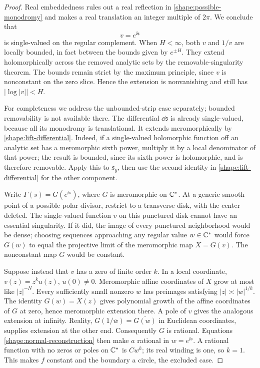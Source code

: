 \begin{proof}
Real embeddedness rules out a real reflection in
\eqref{shape:possible-monodromy} and makes a real translation an
integer multiple of \(2\pi\). We conclude that
\[
 v=e^{\ii\mathfrak s}
\]
is single-valued on the regular complement. When \(H<\infty\), both
\(v\) and \(1/v\) are locally bounded, in fact between the bounds
given by \(e^{\pm H}\). They extend holomorphically across the
removed analytic sets by the removable-singularity theorem. The
bounds remain strict by the maximum principle, since \(v\) is
nonconstant on the zero slice. Hence the extension is nonvanishing
and still has \(|\log|v||<H\).

For completeness we address the unbounded-strip case separately;
bounded removability is not available there. The differential
\(\dd\mathfrak s\) is already single-valued, because all its
monodromy is translational. It extends meromorphically by
\eqref{shape:lift-differential}. Indeed, if a single-valued
holomorphic function off an analytic set has a meromorphic sixth
power, multiply it by a local denominator of that power; the
result is bounded, since its sixth power is holomorphic, and is
therefore removable. Apply this to \(\mathfrak s_y\), then use the
second identity in \eqref{shape:lift-differential} for the other
component.

Write \(\Gamma(s)=G(e^{\ii s})\), where \(G\) is meromorphic on
\(\mathbb C^*\). At a generic smooth point of a possible polar divisor,
restrict to a transverse disk, with the center deleted. The
single-valued function \(v\) on this punctured disk cannot have an
essential singularity. If it did, the image of every punctured
neighborhood would be dense; choosing sequences approaching any
regular value \(w\in\mathbb C^*\) would force
\(G(w)\) to equal the projective limit of the meromorphic map
\(X=G(v)\). The nonconstant map \(G\) would be constant.

Suppose instead that \(v\) has a zero of finite order \(k\). In a
local coordinate, \(v(z)=z^k u(z)\), \(u(0)\ne0\). Meromorphic
affine coordinates of \(X\) grow at most like \(|z|^{-N}\).
Every sufficiently small nonzero \(w\) has preimages satisfying
\(|z|\asymp|w|^{1/k}\). The identity \(G(w)=X(z)\) gives
polynomial growth of the affine coordinates of \(G\) at zero, hence
meromorphic extension there. A pole of \(v\) gives the analogous
extension at infinity. Reality,
\(G(1/\bar w)=\overline{G(w)}\) in Euclidean coordinates, supplies
extension at the other end. Consequently \(G\) is rational.
Equations \eqref{shape:normal-reconstruction} then make \(a\)
rational in \(w=e^{\ii s}\). A rational function with no zeros or
poles on \(\mathbb C^*\) is \(Cw^k\); its real winding is one, so \(k=1\).
This makes \(f\) constant and the boundary a circle, the excluded
case.


\end{proof}
